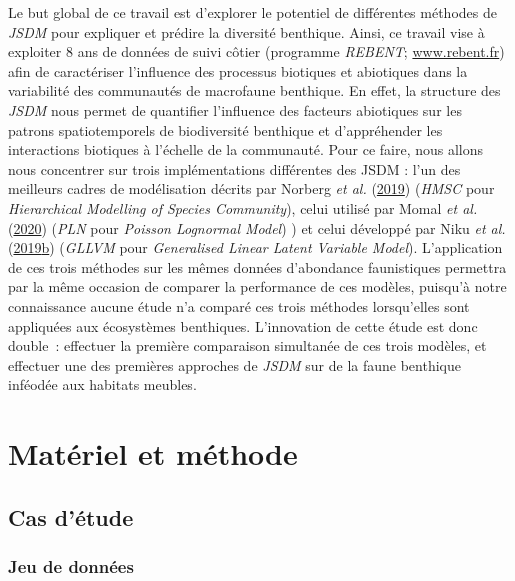 \documentclass[12pt,]{article}
\begin{document}
Le but global de ce travail est d'explorer le potentiel de différentes
méthodes de \emph{JSDM} pour expliquer et prédire la diversité
benthique. Ainsi, ce travail vise à exploiter 8 ans de données de suivi
côtier (programme \emph{REBENT};
\href{http://www.sb-roscoff.fr/fr/observation/programmes/rebent-suivi-stationnel-des-sables-sublittoraux}{www.rebent.fr})
afin de caractériser l'influence des processus biotiques et abiotiques
dans la variabilité des communautés de macrofaune benthique. En effet,
la structure des \emph{JSDM} nous permet de quantifier l'influence des
facteurs abiotiques sur les patrons spatiotemporels de biodiversité
benthique et d'appréhender les interactions biotiques à l'échelle de la
communauté. Pour ce faire, nous allons nous concentrer sur trois
implémentations différentes des JSDM : l'un des meilleurs cadres de
modélisation décrits par Norberg \emph{et al.}
(\protect\hyperlink{ref-Norberg_2020}{2019}) (\emph{HMSC} pour
\emph{Hierarchical Modelling of Species Community}), celui utilisé par
Momal \emph{et al.} (\protect\hyperlink{ref-Momal_2020}{2020})
(\emph{PLN} pour \emph{Poisson Lognormal Model}) ) et celui développé
par Niku \emph{et al.}
(\protect\hyperlink{ref-Niku_2019}{2019}\protect\hyperlink{ref-Niku_2019}{b})
(\emph{GLLVM} pour \emph{Generalised Linear Latent Variable Model}).
L'application de ces trois méthodes sur les mêmes données d'abondance
faunistiques permettra par la même occasion de comparer la performance
de ces modèles, puisqu'à notre connaissance aucune étude n'a comparé ces
trois méthodes lorsqu'elles sont appliquées aux écosystèmes benthiques.
L'innovation de cette étude est donc double~: effectuer la première
comparaison simultanée de ces trois modèles, et effectuer une des
premières approches de \emph{JSDM} sur de la faune benthique inféodée
aux habitats meubles.

\hypertarget{matuxe9riel-et-muxe9thode}{%
\section{Matériel et méthode}\label{matuxe9riel-et-muxe9thode}}

\hypertarget{cas-duxe9tude}{%
\subsection{Cas d'étude}\label{cas-duxe9tude}}

\hypertarget{jeu-de-donnuxe9es}{%
\subsubsection{Jeu de données}\label{jeu-de-donnuxe9es}}
\end{document}

